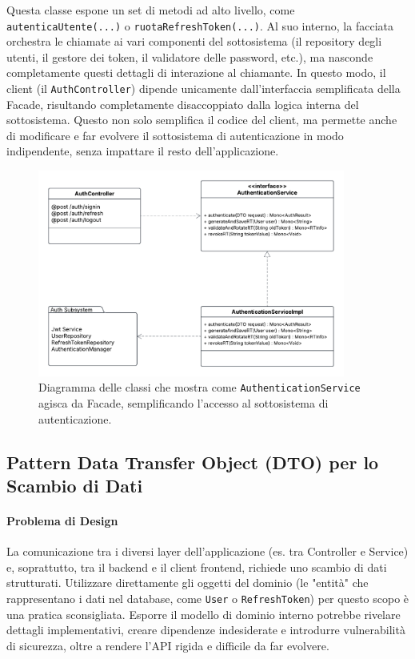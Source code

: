 \documentclass[12pt,a4paper,openright,twoside]{book}
\begin{document}
Questa classe espone un set di metodi ad alto livello, come \texttt{autenticaUtente(...)} o \texttt{ruotaRefreshToken(...)}. Al suo interno, la facciata orchestra le chiamate ai vari componenti del sottosistema (il repository degli utenti, il gestore dei token, il validatore delle password, etc.), ma nasconde completamente questi dettagli di interazione al chiamante. In questo modo, il client (il \texttt{AuthController}) dipende unicamente dall'interfaccia semplificata della Facade, risultando completamente disaccoppiato dalla logica interna del sottosistema. Questo non solo semplifica il codice del client, ma permette anche di modificare e far evolvere il sottosistema di autenticazione in modo indipendente, senza impattare il resto dell'applicazione.

\vspace{1cm}
\begin{figure}[h!]
    \centering
    \includegraphics[width=0.9\textwidth]{figures/facade.pdf}
    \caption{Diagramma delle classi che mostra come \texttt{AuthenticationService} agisca da Facade, semplificando l'accesso al sottosistema di autenticazione.}
    \label{fig:facade_uml}
\end{figure}
\vspace{1cm}

\subsection{Pattern Data Transfer Object (DTO) per lo Scambio di Dati}
\label{subsec:design_dto}

\paragraph{Problema di Design}
La comunicazione tra i diversi layer dell'applicazione (es. tra Controller e Service) e, soprattutto, tra il backend e il client frontend, richiede uno scambio di dati strutturati. Utilizzare direttamente gli oggetti del dominio (le "entità" che rappresentano i dati nel database, come \texttt{User} o \texttt{RefreshToken}) per questo scopo è una pratica sconsigliata. Esporre il modello di dominio interno potrebbe rivelare dettagli implementativi, creare dipendenze indesiderate e introdurre vulnerabilità di sicurezza, oltre a rendere l'API rigida e difficile da far evolvere.
\end{document}
